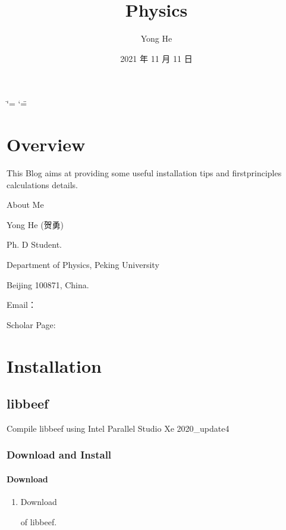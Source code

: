 \documentclass[a4paper,12pt,english]{sphinxmanual}
\title{Physics}
\date{2021 年 11 月 11 日}
\author{Yong He}
\begin{document}
\ifdefined\shorthandoff
  \ifnum\catcode`\=\string=\active\shorthandoff{=}\fi
  \ifnum\catcode`\"=\active{}\fi
\fi

\pagestyle{empty}
\sphinxmaketitle
\pagestyle{plain}
\sphinxtableofcontents
\pagestyle{normal}
\label{\detokenize{index::doc}}



\chapter{Overview}
\label{\detokenize{welcome:overview}}\label{\detokenize{welcome::doc}}
\sphinxAtStartPar
This Blog aims at providing some useful installation tips and first\sphinxhyphen{}principles calculations details.

\begin{DUlineblock}{0em}
\item[] About Me
\item[] Yong He (贺勇)
\item[] Ph. D Student.
\item[] Department of Physics, Peking University
\item[] Beijing 100871, China.
\item[] E\sphinxhyphen{}mail：
\item[] Scholar Page: 
\end{DUlineblock}


\chapter{Installation}
\label{\detokenize{compile:installation}}\label{\detokenize{compile::doc}}

\section{libbeef}
\label{\detokenize{compile:libbeef}}
\sphinxAtStartPar
Compile libbeef using Intel Parallel Studio Xe 2020\_update4


\subsection{Download and Install}
\label{\detokenize{compile/libbeef:download-and-install}}\label{\detokenize{compile/libbeef::doc}}

\subsubsection{Download}
\label{\detokenize{compile/libbeef:download}}\begin{enumerate}
%
\item {} 
\sphinxAtStartPar
Download %
\begin{footnote}[1]\sphinxAtStartFootnote
{}
%
\end{footnote} of libbeef.

\end{enumerate}
\end{document}
